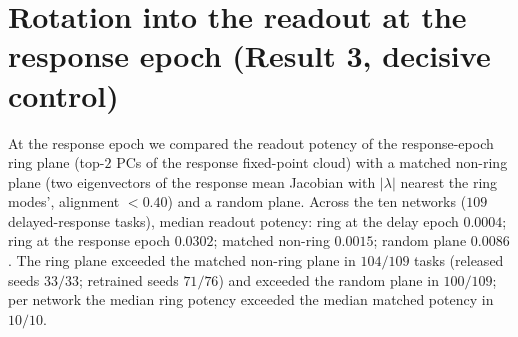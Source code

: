 \documentclass[11pt]{article}
\begin{document}
\section{Rotation into the readout at the response epoch (Result 3, decisive control)}
\label{sec:rotation}
At the response epoch we compared the readout potency of the response-epoch ring plane
(top-$2$ PCs of the response fixed-point cloud) with a matched non-ring plane (two eigenvectors
of the response mean Jacobian with $|\lambda|$ nearest the ring modes', alignment $<0.40$) and a
random plane. Across the ten networks ($109$ delayed-response tasks), median readout potency:
ring at the delay epoch $0.0004$; ring at the response epoch $0.0302$; matched non-ring
$0.0015$; random plane $0.0086$. The ring plane exceeded the matched non-ring plane in $104/109$
tasks (released seeds $33/33$; retrained seeds $71/76$) and exceeded the random plane in
$100/109$; per network the median ring potency exceeded the median matched potency in $10/10$.
\end{document}
